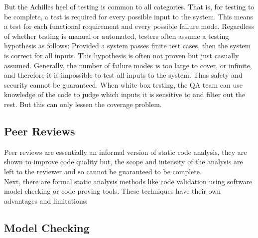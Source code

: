 But the Achilles heel of testing is common to all categories.  That is, for testing to be complete, a test is required for every possible input to the system.  This means a test for each functional requirement and every possible failure mode.  Regardless of whether testing is manual or automated, testers often assume a testing hypothesis as follows: Provided a system passes finite test cases, then the system is correct for all inputs.  This hypothesis is often not proven but just casually assumed.  Generally, the number of failure modes is too large to cover, or infinite, and therefore it is impossible to test all inputs to the system.  Thus safety and security cannot be guaranteed.  When white box testing, the QA team can use knowledge of the code to judge which inputs it is sensitive to and filter out the rest.  But this can only lessen the coverage problem.

\subsection{Peer Reviews}
\label{subSec:PeerReviews}

Peer reviews are essentially an informal version of static code analysis, they are shown to improve code quality \cite{CodeCompleteCodeReviews} but, the scope and intensity of the analysis are left to the reviewer and so cannot be guaranteed to be complete.\\


\noindent Next, there are formal static analysis methods like code validation using software model checking or code proving tools.  These techniques have their own advantages and limitations:

\subsection{Model Checking}
\label{subSec:ModelChecking}

